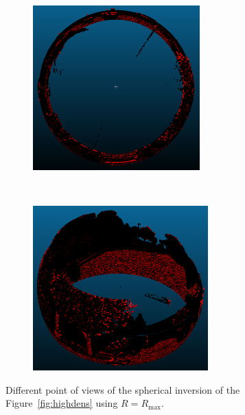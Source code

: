 \begin{figure}[t!]
  \centering
    \begin{subfigure}[t]{0.5\textwidth}
      \centering
	\includegraphics[height=2.5in]{img/hpr1.png}
    \end{subfigure}%
    ~
    \begin{subfigure}[t]{0.5\textwidth}
      \centering
	\includegraphics[height=2.5in]{img/hpr2.png}
    \end{subfigure}
    \caption{Different point of views of the spherical inversion of the Figure~\ref{fig:highdens} using $R = R_\text{max}$.}
    \label{fig:hpr1}
\end{figure}

